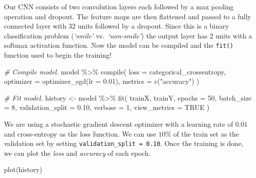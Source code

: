 \documentclass[
  11pt,
]{krantz}
\newenvironment{Shaded}{\begin{snugshade}}{\end{snugshade}}
\newcommand{\AttributeTok}[1]{\textcolor[rgb]{0.61,0.61,0.61}{#1}}
\newcommand{\CommentTok}[1]{\textcolor[rgb]{0.37,0.37,0.37}{\textit{#1}}}
\newcommand{\ConstantTok}[1]{\textcolor[rgb]{0,0,0}{#1}}
\newcommand{\DecValTok}[1]{\textcolor[rgb]{0.06,0.06,0.06}{#1}}
\newcommand{\FloatTok}[1]{\textcolor[rgb]{0.06,0.06,0.06}{#1}}
\newcommand{\FunctionTok}[1]{\textcolor[rgb]{0,0,0}{#1}}
\newcommand{\NormalTok}[1]{#1}
\newcommand{\OtherTok}[1]{\textcolor[rgb]{0.37,0.37,0.37}{#1}}
\newcommand{\SpecialCharTok}[1]{\textcolor[rgb]{0,0,0}{#1}}
\newcommand{\StringTok}[1]{\textcolor[rgb]{0.5,0.5,0.5}{#1}}
\begin{document}
Our CNN consists of two convolution layers each followed by a max pooling operation and dropout. The feature maps are then flattened and passed to a fully connected layer with \(32\) units followed by a dropout. Since this is a binary classification problem (\emph{`smile'} vs.~\emph{`non-smile'}) the output layer has \(2\) units with a softmax activation function. Now the model can be compiled and the \texttt{fit()} function used to begin the training!

\begin{Shaded}
\begin{Highlighting}[]
\CommentTok{\# Compile model.}
\NormalTok{model }\SpecialCharTok{\%\textgreater{}\%} \FunctionTok{compile}\NormalTok{(}
  \AttributeTok{loss =} \StringTok{\textquotesingle{}categorical\_crossentropy\textquotesingle{}}\NormalTok{,}
  \AttributeTok{optimizer =} \FunctionTok{optimizer\_sgd}\NormalTok{(}\AttributeTok{lr =} \FloatTok{0.01}\NormalTok{),}
  \AttributeTok{metrics =} \FunctionTok{c}\NormalTok{(}\StringTok{"accuracy"}\NormalTok{)}
\NormalTok{)}

\CommentTok{\# Fit model.}
\NormalTok{history }\OtherTok{\textless{}{-}}\NormalTok{ model }\SpecialCharTok{\%\textgreater{}\%} \FunctionTok{fit}\NormalTok{(}
\NormalTok{  trainX, trainY,}
  \AttributeTok{epochs =} \DecValTok{50}\NormalTok{,}
  \AttributeTok{batch\_size =} \DecValTok{8}\NormalTok{,}
  \AttributeTok{validation\_split =} \FloatTok{0.10}\NormalTok{,}
  \AttributeTok{verbose =} \DecValTok{1}\NormalTok{,}
  \AttributeTok{view\_metrics =} \ConstantTok{TRUE}
\NormalTok{)}
\end{Highlighting}
\end{Shaded}

We are using a stochastic gradient descent optimizer with a learning rate of \(0.01\) and cross-entropy as the loss function. We can use \(10\%\) of the train set as the validation set by setting \texttt{validation\_split\ =\ 0.10}. Once the training is done, we can plot the \emph{loss} and \emph{accuracy} of each epoch.

\begin{Shaded}
\begin{Highlighting}[]
\FunctionTok{plot}\NormalTok{(history)}
\end{Highlighting}
\end{Shaded}
\end{document}
